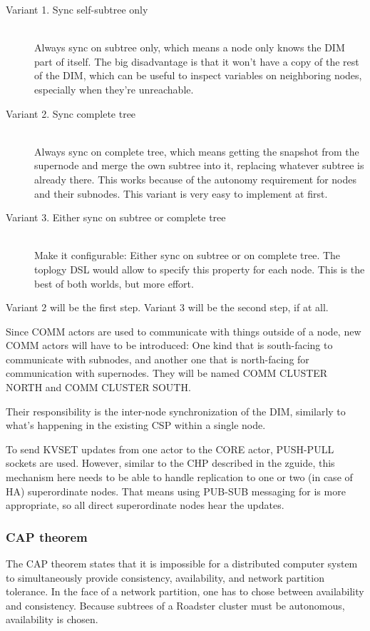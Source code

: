 \begin{description}
	\item [Variant 1. Sync self-subtree only] \hfill\\
	Always sync on subtree only, which means a node only knows the DIM part of
	itself. The big disadvantage is that it won't have a copy of the rest of the
	DIM, which can be useful to inspect variables on neighboring nodes, especially
	when they're unreachable.

	\item [Variant 2. Sync complete tree] \hfill\\
	Always sync on complete tree, which means getting the snapshot from the
	supernode and merge the own subtree into it, replacing whatever subtree is
	already there. This works because of the autonomy requirement for nodes and
	their subnodes. This variant is very easy to implement at first.

	\item [Variant 3. Either sync on subtree or complete tree] \hfill\\
	Make it configurable: Either sync on subtree or on complete tree. The
	toplogy DSL would allow to specify this property for each node. This is
	the best of both worlds, but more effort.
\end{description}

Variant 2 will be the first step. Variant 3 will be the second step, if at all.

Since COMM actors are used to communicate with things outside of a node, new COMM
actors will have to be introduced: One kind that is south-facing to communicate
with subnodes, and another one that is north-facing for communication with
supernodes. They will be named COMM CLUSTER NORTH and COMM CLUSTER SOUTH.

Their responsibility is the inter-node synchronization of the DIM, similarly to
what's happening in the existing CSP within a single node.

To send KVSET updates from one actor to the CORE actor, PUSH-PULL sockets are
used. However, similar to the \gls{CHP} described in the \gls{zguide}, this
mechanism here needs to be able to handle replication to one or two (in case of
HA) superordinate nodes. That means using PUB-SUB messaging for is more
appropriate, so all direct superordinate nodes hear the updates.

\subsubsection{CAP theorem}
The CAP theorem \cite{wp:cap} states that it is impossible for a distributed
computer system to simultaneously provide consistency, availability, and
network partition tolerance. In the face of a network partition, one has to
chose between availability and consistency. Because subtrees of a Roadster
cluster must be autonomous, availability is chosen.

